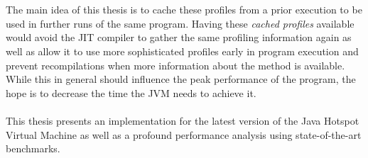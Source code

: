 \\\\
The main idea of this thesis is to cache these profiles from a prior execution to be used in further runs of the same program. 
Having these \textit{cached profiles} available would avoid the JIT compiler to gather the same profiling information again as well as allow it to use more sophisticated profiles early in program execution and prevent recompilations when more information about the method is available. While this in general should influence the peak performance of the program, the hope is to decrease the time the JVM needs to achieve it.
\\\\
This thesis presents an implementation for the latest version of the Java Hotspot Virtual Machine as well as a profound performance analysis using state-of-the-art benchmarks.
